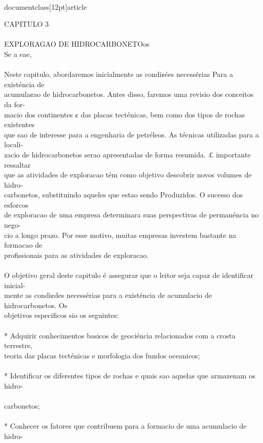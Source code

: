 \\documentclass[12pt]{article}
\begin{document}
CAPITULO 3\\
\\
EXPLORAGAO DE HIDROCARBONETOos\\
Se a eae,\\
\\
Neste capitulo, abordaremos inicialmente as condi¢ées necessérias Para a existéncia de\\
acumula¢ao de hidrocarbonetos. Antes disso, faremos uma revisio dos conceitos da for-\\
macio dos continentes ¢ das placas tecténicas, bem como dos tipos de rochas existentes\\
que sao de interesse para a engenharia de petréleos. As técnicas utilizadas para a locali-\\
zacio de hidrocarbonetos serao apresentadas de forma resumida. £ importante ressaltar\\
que as atividades de exploracao tém como objetivo descobrir novos volumes de hidro-\\
carbonetos, substituindo aqueles que estao sendo Produzidos. O sucesso dos esforcos\\
de exploracao de uma empresa determinara suas perspectivas de permanéncia no nego-\\
cio a longo prazo. Por esse motivo, muitas empresas investem bastante na formacao de\\
profissionais para as atividades de exploracao.\\
\\
O objetivo geral deste capitulo é assegurar que o leitor seja capaz de identificar inicial-\\
mente as condi¢des necessérias para a existéncia de acumulacio de hidrocarbonetos. Os\\
objetivos especificos sio os seguintes:\\
\\
* Adquirir conhecimentos basicos de geociéncia relacionados com a crosta terrestre,\\
teoria das placas tecténicas e morfologia dos fundos oceanicos;\\
\\
* Identificar os diferentes tipos de rochas e quais sao aquelas que armazenam os hidro-\\
\\
carbonetos;\\
\\
* Conhecer os fatores que contribuem para a formacio de uma acumulacio de hidro-\\
\end{document}
